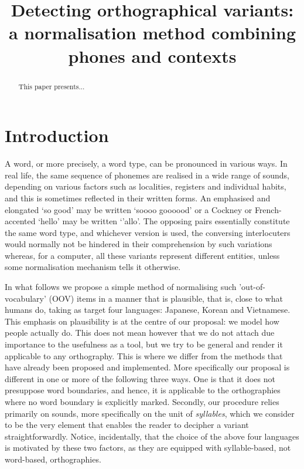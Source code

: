 \documentclass[11pt]{article}
\title{Detecting orthographical variants: a normalisation method combining phones and contexts}
\begin{document}
\maketitle

\begin{abstract}
This paper presents...

\end{abstract}

\section{Introduction}

A word, or more precisely, a word type, can be pronounced in various ways. In real life, the same sequence of phonemes are realised in a wide range of sounds, depending on various factors such as localities, registers and individual habits, and this is sometimes reflected in their written forms. An emphasised and elongated `so good' may be written `soooo goooood' or a Cockney or French-accented `hello' may be written `'allo'. The opposing pairs essentially constitute the same word type, and whichever version is used, the conversing interlocuters would normally not be hindered in their comprehension by such variations whereas, for a computer, all these variants represent different entities, unless some normalisation mechanism tells it otherwise. 

In what follows we propose a simple method of normalising such 'out-of-vocabulary' (OOV) items in a manner that is plausible, that is, close to what humans do, taking as target four languages: Japanese, Korean and Vietnamese. This emphasis on plausibility is at the centre of our proposal: we model how people actually do. This does not mean however that we do not attach due importance to the usefulness as a tool, but we try to be general and render it applicable to any orthography. This is where we differ from the methods that have already been proposed and implemented. More specifically our proposal is different in one or more of the following three ways. One is that it does not presuppose word boundaries, and hence, it is applicable to the orthographies where no word boundary is explicitly marked. Secondly, our procedure relies primarily on sounds, more specifically on the unit of \emph{syllables}, which we consider to be the very element that enables the reader to decipher a variant straightforwardly. Notice, incidentally, that the choice of the above four languages is motivated by these two factors, as they are equipped with syllable-based, not word-based, orthographies. 
\end{document}
